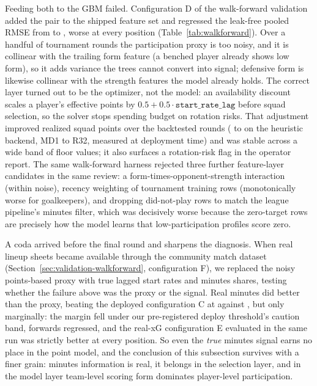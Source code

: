 Feeding both to the GBM failed. Configuration D of the walk-forward
validation added the pair to the shipped feature set and regressed
the leak-free pooled RMSE from \WalkforwardPooledC{} to
\WalkforwardPooledD{}, worse at every position
(Table~\ref{tab:walkforward}). Over a handful of tournament rounds
the participation proxy is too noisy, and it is collinear with the
trailing form feature (a benched player already shows low form), so
it adds variance the trees cannot convert into signal; defensive form
is likewise collinear with the strength features the model already
holds. The correct layer turned out to be the optimizer, not the
model: an availability discount scales a player's effective points by
$0.5 + 0.5 \cdot \mathtt{start\_rate\_lag}$ before squad selection,
so the solver stops spending budget on rotation risks. That
adjustment improved realized squad points over the backtested rounds
(\AvailabilityWithout{} to \AvailabilityWith{} on the heuristic
backend, MD1 to R32, measured at deployment time) and was stable
across a wide band of floor values; it also surfaces a rotation-risk
flag in the operator report. The same walk-forward harness rejected
three further feature-layer candidates in the same review: a
form-times-opponent-strength interaction (within noise), recency
weighting of tournament training rows (monotonically worse for
goalkeepers), and dropping did-not-play rows to match the league
pipeline's minutes filter, which was decisively worse because the
zero-target rows are precisely how the model learns that
low-participation profiles score zero.

A coda arrived before the final round and sharpens the diagnosis.
When real lineup sheets became available through the community match
dataset (Section~\ref{sec:validation-walkforward}, configuration F),
we replaced the noisy points-based proxy with true lagged start
rates and minutes shares, testing whether the failure above was the
proxy or the signal. Real minutes did better than the proxy, beating
the deployed configuration C at \WalkforwardPooledF{} against
\WalkforwardPooledC{}, but only marginally: the margin fell under
our pre-registered deploy threshold's caution band, forwards
regressed, and the real-xG configuration E evaluated in the same run
was strictly better at every position. So even the \emph{true}
minutes signal earns no place in the point model, and the
conclusion of this subsection survives with a finer grain: minutes
information is real, it belongs in the selection layer, and in the
model layer team-level scoring form dominates player-level
participation.

